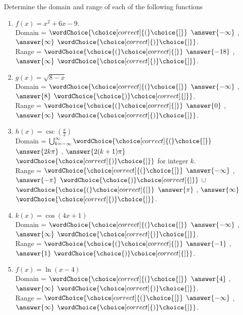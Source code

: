 \documentclass{ximera}
\author{Elizabeth Campolongo}
\begin{document}
\begin{exercise}
Determine the domain and range of each of the following functions
%
\begin{enumerate}

\item $f(x) = x^2+6x-9.$\\
Domain = $\wordChoice{\choice[correct]{(}\choice{[}}$ $\answer{-\infty}$ , $\answer{\infty}$ $\wordChoice{\choice[correct]{)}\choice{]}}$.\\
Range = $\wordChoice{\choice{(}\choice[correct]{[}}$ $\answer{-18}$ , $\answer{\infty}$ $\wordChoice{\choice[correct]{)}\choice{]}}$.


\item $g(x) = \sqrt{8-x} $\\
Domain = $\wordChoice{\choice[correct]{(}\choice{[}}$ $\answer{-\infty}$ , $\answer{8}$ $\wordChoice{\choice{)}\choice[correct]{]}}$.\\
Range = $\wordChoice{\choice{(}\choice[correct]{[}}$ $\answer{0}$ , $\answer{\infty}$ $\wordChoice{\choice[correct]{)}\choice{]}}$.


\item $h(x) = \csc\!\left(\frac{x}{2}\right)$\\
Domain = $\bigcup_{k=-\infty}^{\infty}
\wordChoice{\choice[correct]{(}\choice{[}}$ $\answer{2k\pi}$ , $\answer{2(k+1)\pi}$ $\wordChoice{\choice[correct]{)}\choice{]}}$ for integer $k$.\\
Range = $\wordChoice{\choice[correct]{(}\choice{[}}$ 
$\answer{-\infty}$ , $\answer{-\pi}$ 
$\wordChoice{\choice{)}\choice[correct]{]}}$ 
$\cup$  
$\wordChoice{\choice{(}\choice[correct]{[}}$ 
$\answer{\pi}$ , $\answer{\infty}$ 
$\wordChoice{\choice[correct]{)}\choice{]}}$.

\item $k(x) = \cos(4x+1)$ \\
Domain = $\wordChoice{\choice[correct]{(}\choice{[}}$ 
$\answer{-\infty}$ , $\answer{\infty}$ 
$\wordChoice{\choice[correct]{)}\choice{]}}$.\\
Range = $\wordChoice{\choice{(}\choice[correct]{[}}$ $\answer{-1}$ , $\answer{1}$ $\wordChoice{\choice{)}\choice[correct]{]}}$.


\item $f(x) = \ln(x-4)$ \\
Domain = $\wordChoice{\choice[correct]{(}\choice{[}}$ $\answer{4}$ , $\answer{\infty}$ $\wordChoice{\choice[correct]{)}\choice{]}}$.\\
Range = $\wordChoice{\choice[correct]{(}\choice{[}}$ $\answer{-\infty}$ , $\answer{\infty}$ $\wordChoice{\choice[correct]{)}\choice{]}}$.



\end{enumerate}
\end{exercise}
\end{document}
